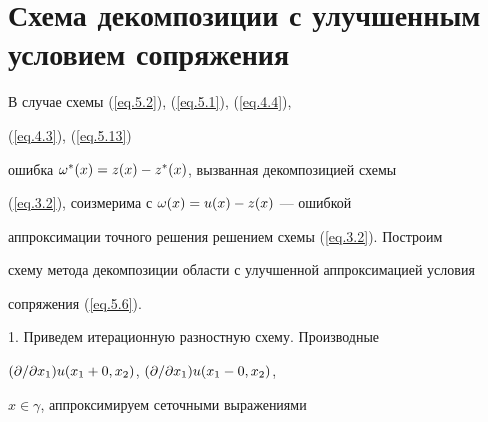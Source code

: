 \section{Схема декомпозиции с улучшенным условием сопряжения}


\label{section.6}





В случае схемы (\ref{eq.5.2}), (\ref{eq.5.1}), (\ref{eq.4.4}),


(\ref{eq.4.3}), (\ref{eq.5.13})


ошибка $\omega^*(x)=z(x)-z^*(x)$, вызванная декомпозицией схемы


(\ref{eq.3.2}), соизмерима с $\omega(x)=u(x)-z(x)$ --- ошибкой


аппроксимации точного решения решением схемы (\ref{eq.3.2}). Построим


схему метода декомпозиции области с улучшенной аппроксимацией условия


сопряжения (\ref{eq.5.6}).


\medskip





1. Приведем итерационную разностную схему. Производные


$(\displaystyle \partial /\displaystyle \partial x_1)u(x_1+0, x_2)$, $(\displaystyle \partial /\displaystyle \partial x_1)u(x_1-0, x_2)$,


$x\in\gamma$, аппроксимируем сеточными выражениями


